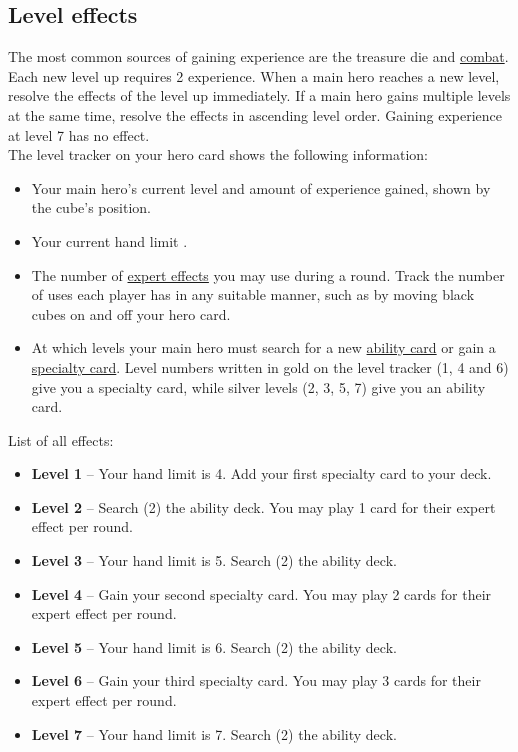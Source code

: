 \documentclass[12pt]{article}
\begin{document}
\subsection*{\hypertarget{Level}{Level effects}}
The most common sources of gaining experience are the treasure die and \hyperlink{Combatexperience}{combat}. Each new level up requires 2 experience. When a main hero reaches a new level, resolve the effects of the level up immediately. If a main hero gains multiple levels at the same time, resolve the effects in ascending level order. Gaining experience at level 7 has no effect.\\[6pt]
The level tracker on your hero card shows the following information:
\begin{itemize}
\item Your main hero’s current level and amount of experience gained, shown by the cube's position.
\item Your current hand limit .
\item The number of \hyperlink{Ability}{expert effects}  you may use during a round. Track the number of uses each player has in any suitable manner, such as by moving black cubes on and off your hero card.
\item At which levels your main hero must search for a new \hyperlink{Ability}{ability card} or gain a \hyperlink{Specialty}{specialty card}. Level numbers written in gold on the level tracker (1, 4 and 6) give you a specialty card, while silver levels (2, 3, 5, 7) give you an ability card.
\end{itemize}
List of all effects:
\begin{itemize}
\item \textbf{Level 1} – Your hand limit is 4. Add your first specialty card to your deck.
\item \textbf{Level 2} – Search (2) the ability deck. You may play 1 card for their expert effect per round.
\item \textbf{Level 3} – Your hand limit is 5. Search (2) the ability deck.
\item \textbf{Level 4} – Gain your second specialty card. You may play 2 cards for their expert effect per round.
\item \textbf{Level 5} – Your hand limit is 6. Search (2) the ability deck.
\item \textbf{Level 6} – Gain your third specialty card. You may play 3 cards for their expert effect per round.
\item \textbf{Level 7} – Your hand limit is 7. Search (2) the ability deck.
\end{itemize}
\end{document}
